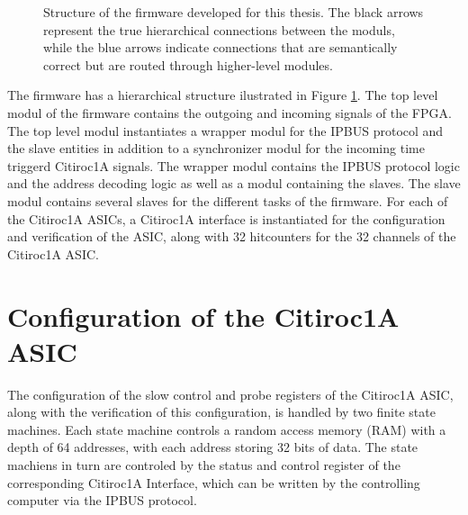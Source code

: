 \begin{figure}[H]
\begin{tikzpicture}[node distance=2cm]
        
    \end{tikzpicture}
    \caption{Structure of the firmware developed for this thesis. The black arrows represent the true hierarchical 
    connections between the moduls, while the blue arrows indicate connections that are semantically correct but are routed through higher-level modules.}
    \label{fig:Firmware_structure}
\end{figure}
The firmware has a hierarchical structure ilustrated in Figure \ref{fig:Firmware_structure}. 
\newline
The top level modul of the firmware contains the outgoing and incoming signals of the FPGA.
\newline
The top level modul instantiates a wrapper modul for the IPBUS protocol and the slave entities in addition to a synchronizer modul for the incoming time triggerd Citiroc1A signals. 
\newline
The wrapper modul contains the IPBUS protocol logic and the address decoding logic as well as a modul containing the slaves.
\newline
The slave modul contains several slaves for the different tasks of the firmware. For each of the Citiroc1A ASICs, a Citiroc1A interface is instantiated for the configuration and verification of the ASIC, along with
32 hitcounters for the 32 channels of the Citiroc1A ASIC. 



\section{Configuration of the Citiroc1A ASIC}

The configuration of the slow control and probe registers of the Citiroc1A ASIC,
 along with the verification of this configuration, is handled by two finite state machines.
 \newline
  Each state machine controls a random access memory (RAM) with a depth of 64 addresses,
  with each address storing 32 bits of data.
 \newline
The state machiens in turn are controled by the status and control register of the corresponding Citiroc1A Interface, which can be written by the controlling computer via the IPBUS protocol.

